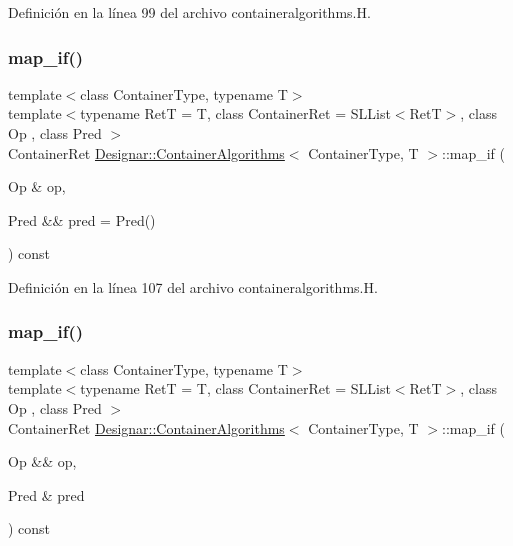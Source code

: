 Definición en la línea 99 del archivo containeralgorithms.\+H.

\mbox{\label{class_designar_1_1_container_algorithms_a06b2fbf8f85675b8c69be00399710031}} 
\subsubsection{\texorpdfstring{map\+\_\+if()}{map\_if()}\hspace{0.1cm}{\footnotesize\ttfamily [2/4]}}
{\footnotesize\ttfamily template$<$class Container\+Type, typename T$>$ \\
template$<$typename RetT  = T, class Container\+Ret  = S\+L\+List$<$\+Ret\+T$>$, class Op , class Pred $>$ \\
Container\+Ret \hyperlink{class_designar_1_1_container_algorithms}{Designar\+::\+Container\+Algorithms}$<$ Container\+Type, T $>$\+::map\+\_\+if (\begin{DoxyParamCaption}\item[{Op \&}]{op,  }\item[{Pred \&\&}]{pred = {\ttfamily Pred()} }\end{DoxyParamCaption}) const\hspace{0.3cm}{\ttfamily [inline]}}



Definición en la línea 107 del archivo containeralgorithms.\+H.

\mbox{\label{class_designar_1_1_container_algorithms_a582b067d39658825339075873f20aee6}} 
\subsubsection{\texorpdfstring{map\+\_\+if()}{map\_if()}\hspace{0.1cm}{\footnotesize\ttfamily [3/4]}}
{\footnotesize\ttfamily template$<$class Container\+Type, typename T$>$ \\
template$<$typename RetT  = T, class Container\+Ret  = S\+L\+List$<$\+Ret\+T$>$, class Op , class Pred $>$ \\
Container\+Ret \hyperlink{class_designar_1_1_container_algorithms}{Designar\+::\+Container\+Algorithms}$<$ Container\+Type, T $>$\+::map\+\_\+if (\begin{DoxyParamCaption}\item[{Op \&\&}]{op,  }\item[{Pred \&}]{pred }\end{DoxyParamCaption}) const\hspace{0.3cm}{\ttfamily [inline]}}



